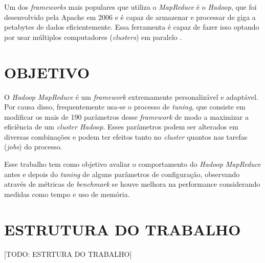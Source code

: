 Um dos \textit{frameworks} mais populares que utiliza o \textit{MapReduce} é o \textit{Hadoop}, que foi desenvolvido pela Apache em 2006 e é capaz de armazenar e processar de giga a petabytes de dados eficientemente. Essa ferramenta é capaz de fazer isso optando por usar múltiplos computadores (\textit{clusters}) em paralelo \cite{HadoopBook15}.

\section{OBJETIVO} \label{sec:objetivo}

O \textit{Hadoop MapReduce} é um \textit{framework} extremamente personalizável e adaptável. Por causa disso, frequentemente usa-se o processo de \textit{tuning}, que consiste em modificar os mais de 190 parâmetros desse \textit{framework} de modo a maximizar a eficiência de um \textit{cluster Hadoop}. Esses parâmetros podem ser alterados em diversas combinações e podem ter efeitos tanto no \textit{cluster} quantos nas tarefas (\textit{jobs}) do processo.

Esse trabalho tem como objetivo avaliar o comportamento do \textit{Hadoop MapReduce} antes e depois do \textit{tuning} de alguns parâmetros de configuração, observando através de métricas de \textit{benchmark} se houve melhora na performance considerando medidas como tempo e uso de memória.

\section{ESTRUTURA DO TRABALHO} \label{sec:estrtura}

[TODO: ESTRTURA DO TRABALHO]
